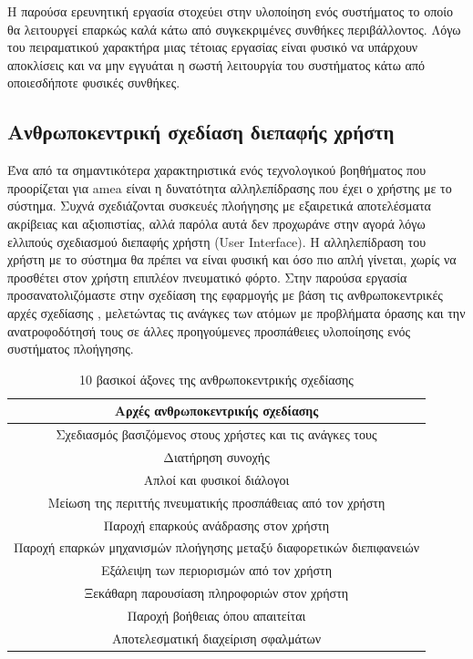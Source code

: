 Η παρούσα ερευνητική εργασία στοχεύει στην υλοποίηση ενός συστήματος το οποίο θα λειτουργεί επαρκώς καλά κάτω από συγκεκριμένες συνθήκες περιβάλλοντος. Λόγω του πειραματικού χαρακτήρα μιας τέτοιας εργασίας είναι φυσικό να υπάρχουν αποκλίσεις και να μην εγγυάται η σωστή λειτουργία του συστήματος κάτω από οποιεσδήποτε φυσικές συνθήκες.

\subsection{Ανθρωποκεντρική σχεδίαση διεπαφής χρήστη}
Ένα από τα σημαντικότερα χαρακτηριστικά ενός τεχνολογικού βοηθήματος που προορίζεται για \acrshort{amea} είναι η δυνατότητα αλληλεπίδρασης που έχει ο χρήστης με το σύστημα. Συχνά σχεδιάζονται συσκευές πλοήγησης με εξαιρετικά αποτελέσματα ακρίβειας και αξιοπιστίας, αλλά παρόλα αυτά δεν προχωράνε στην αγορά λόγω ελλιπούς σχεδιασμού διεπαφής χρήστη (User Interface). Η αλληλεπίδραση του χρήστη με το σύστημα θα πρέπει να είναι φυσική και όσο πιο απλή γίνεται, χωρίς να προσθέτει στον χρήστη επιπλέον πνευματικό φόρτο. Στην παρούσα εργασία προσανατολιζόμαστε στην σχεδίαση της εφαρμογής με βάση τις ανθρωποκεντρικές αρχές σχεδίασης \cite{10KeyPri45:online}, μελετώντας τις ανάγκες των ατόμων με προβλήματα όρασης και την ανατροφοδότησή τους σε άλλες προηγούμενες προσπάθειες υλοποίησης ενός συστήματος πλοήγησης.

\begin{table}[H]
    \centering
    \begin{tabular}{|c|}
        \hline
        \textbf{Αρχές ανθρωποκεντρικής σχεδίασης}\\
        \hline
        \hline
        Σχεδιασμός βασιζόμενος στους χρήστες και τις ανάγκες τους\\
        Διατήρηση συνοχής\\
        Απλοί και φυσικοί διάλογοι\\
        Μείωση της περιττής πνευματικής προσπάθειας από τον χρήστη\\
        Παροχή επαρκούς ανάδρασης στον χρήστη\\
        Παροχή επαρκών μηχανισμών πλοήγησης μεταξύ διαφορετικών διεπιφανειών\\
        Εξάλειψη των περιορισμών από τον χρήστη\\
        Ξεκάθαρη παρουσίαση πληροφοριών στον χρήστη\\
        Παροχή βοήθειας όπου απαιτείται\\
        Αποτελεσματική διαχείριση σφαλμάτων\\
        \hline
    \end{tabular}
    \caption{10 βασικοί άξονες της ανθρωποκεντρικής σχεδίασης \cite{10KeyPri45:online}}
    \label{tab:ucdesign}
\end{table}

